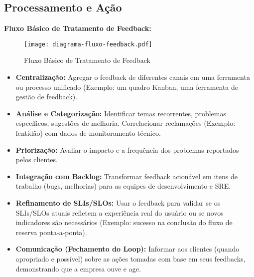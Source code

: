 \subsection{Processamento e Ação}
\label{subsec:processamento-feedback}

\textbf{Fluxo Básico de Tratamento de Feedback:}

\begin{figure}[htbp]
    \centering
    \texttt{[image: diagrama-fluxo-feedback.pdf]}
    \caption{Fluxo Básico de Tratamento de Feedback}
    \label{fig:fluxo-feedback}
\end{figure}

\begin{itemize}
    \item \textbf{Centralização:} Agregar o feedback de diferentes canais em uma ferramenta ou processo unificado (Exemplo: um quadro Kanban, uma ferramenta de gestão de feedback).
    \item \textbf{Análise e Categorização:} Identificar temas recorrentes, problemas específicos, sugestões de melhoria. Correlacionar reclamações (Exemplo: lentidão) com dados de monitoramento técnico.
    \item \textbf{Priorização:} Avaliar o impacto e a frequência dos problemas reportados pelos clientes.
    \item \textbf{Integração com Backlog:} Transformar feedback acionável em itens de trabalho (bugs, melhorias) para as equipes de desenvolvimento e SRE.
    \item \textbf{Refinamento de SLIs/SLOs:} Usar o feedback para validar se os SLIs/SLOs atuais refletem a experiência real do usuário ou se novos indicadores são necessários (Exemplo: sucesso na conclusão do fluxo de reserva ponta-a-ponta).
    \item \textbf{Comunicação (Fechamento do Loop):} Informar aos clientes (quando apropriado e possível) sobre as ações tomadas com base em seus feedbacks, demonstrando que a empresa ouve e age.
\end{itemize}


